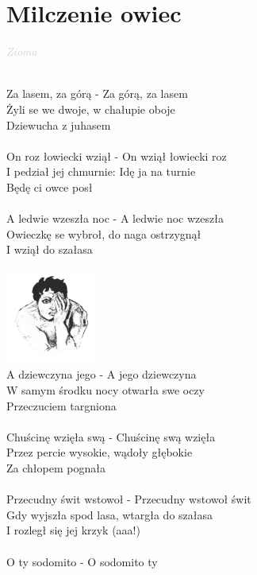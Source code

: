 \documentclass[a5paper, 10pt]{book}
\begin{document}
\section{Milczenie owiec}\textcolor{lightgray}{\textit{Zioma}}\\~\\
\begin{minipage}[t]{0.8\textwidth}
  Za lasem, za górą - Za górą, za lasem\\
  Żyli se we dwoje, w chałupie oboje\\
  Dziewucha z juhasem\\
  \\
  On roz łowiecki wziął - On wziął łowiecki roz\\
  I pedział jej chmurnie: Idę ja na turnie\\
  Będę ci owce posł\\
  \\
  A ledwie wzeszła noc - A ledwie noc wzeszła\\
  Owieczkę se wybroł, do naga ostrzygnął\\
  I wziął do szałasa\\
  \\
  \includegraphics[height=3cm, right]{images/milczenie_owiec.png}\vspace*{-3.05cm}\\
  A dziewczyna jego - A jego dziewczyna\\
  W samym środku nocy otwarła swe oczy\\
  Przeczuciem targniona\\
  \\
  Chuścinę wzięła swą - Chuścinę swą wzięła\\
  Przez percie wysokie, wądoły głębokie\\
  Za chłopem pognała\\
  \\
  Przecudny świt wstowoł - Przecudny wstowoł świt\\
  Gdy wyjszła spod lasa, wtargła do szałasa\\
  I rozległ się jej krzyk (aaa!)\\
  \\
  O ty sodomito - O sodomito ty\\

\end{minipage}
\end{document}
